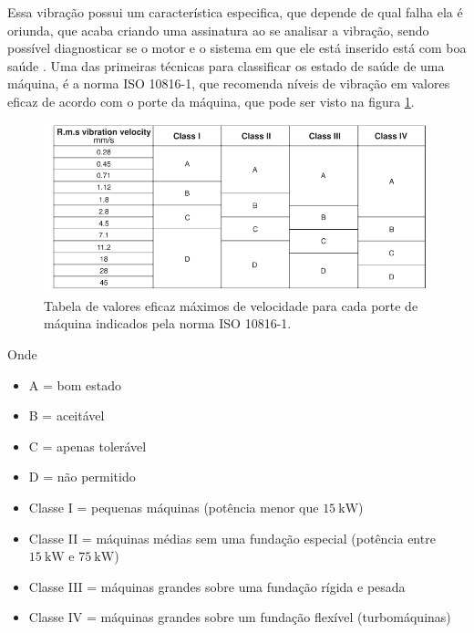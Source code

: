 Essa vibração possui um característica especifica, que depende de qual falha ela é oriunda, que acaba criando uma assinatura
ao se analisar a vibração, sendo possível diagnosticar se o motor e o sistema em que ele está inserido está com boa saúde \cite{Wu2013}.
Uma das primeiras técnicas para classificar os estado de saúde de uma máquina, é a norma ISO 10816-1, que recomenda níveis de vibração 
em valores eficaz de acordo com o porte da máquina, que pode ser visto na figura \ref{fig:iso10816-1_randall_p146}.

\begin{figure}[H]
    \caption{Tabela de valores eficaz máximos de velocidade para cada porte de máquina indicados pela norma ISO 10816-1.}
    \begin{center}
        \includegraphics[scale=.5]{referencial/img/iso10816-1_randall_p146.png}
    \end{center}
    \label{fig:iso10816-1_randall_p146}
\end{figure}

Onde

\begin{itemize}
    \item A = bom estado
    \item B = aceitável
    \item C = apenas tolerável
    \item D = não permitido
    \item Classe I = pequenas máquinas (potência menor que $\SI{15}{\kilo\watt}$)
    \item Classe II = máquinas médias sem uma fundação especial (potência entre $\SI{15}{\kilo\watt}$ e $\SI{75}{\kilo\watt}$)
    \item Classe III = máquinas grandes sobre uma fundação rígida e pesada
    \item Classe IV = máquinas grandes sobre um fundação flexível (turbomáquinas) 
\end{itemize}

